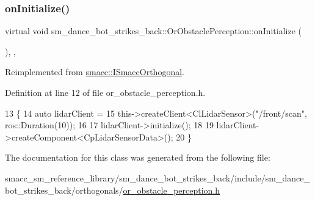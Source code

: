 \subsubsection{\texorpdfstring{on\+Initialize()}{onInitialize()}}
{\footnotesize\ttfamily virtual void sm\+\_\+dance\+\_\+bot\+\_\+strikes\+\_\+back\+::\+Or\+Obstacle\+Perception\+::on\+Initialize (\begin{DoxyParamCaption}{ }\end{DoxyParamCaption})\hspace{0.3cm}{\ttfamily [inline]}, {\ttfamily [override]}, {\ttfamily [virtual]}}



Reimplemented from \hyperlink{classsmacc_1_1ISmaccOrthogonal_a6bb31c620cb64dd7b8417f8705c79c7a}{smacc\+::\+I\+Smacc\+Orthogonal}.



Definition at line 12 of file or\+\_\+obstacle\+\_\+perception.\+h.


\begin{DoxyCode}
13     \{
14         \textcolor{keyword}{auto} lidarClient =
15             this->createClient<ClLidarSensor>(\textcolor{stringliteral}{"/front/scan"}, ros::Duration(10));
16 
17         lidarClient->initialize();
18 
19         lidarClient->createComponent<CpLidarSensorData>();
20     \}
\end{DoxyCode}


The documentation for this class was generated from the following file\+:\begin{DoxyCompactItemize}
\item 
smacc\+\_\+sm\+\_\+reference\+\_\+library/sm\+\_\+dance\+\_\+bot\+\_\+strikes\+\_\+back/include/sm\+\_\+dance\+\_\+bot\+\_\+strikes\+\_\+back/orthogonals/\hyperlink{sm__dance__bot__strikes__back_2include_2sm__dance__bot__strikes__back_2orthogonals_2or__obstacle__perception_8h}{or\+\_\+obstacle\+\_\+perception.\+h}\end{DoxyCompactItemize}
